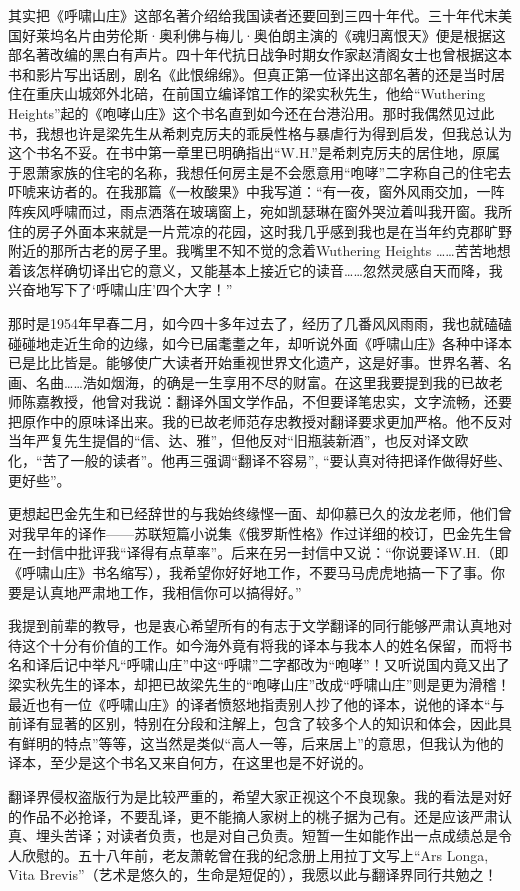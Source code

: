 \par 其实把《呼啸山庄》这部名著介绍给我国读者还要回到三四十年代。三十年代末美国好莱坞名片由劳伦斯·奥利佛与梅儿·奥伯朗主演的《魂归离恨天》便是根据这部名著改编的黑白有声片。四十年代抗日战争时期女作家赵清阁女士也曾根据这本书和影片写出话剧，剧名《此恨绵绵》。但真正第一位译出这部名著的还是当时居住在重庆山城郊外北碚，在前国立编译馆工作的梁实秋先生，他给“Wuthering Heights”起的《咆哮山庄》这个书名直到如今还在台港沿用。那时我偶然见过此书，我想也许是梁先生从希刺克厉夫的乖戾性格与暴虐行为得到启发，但我总认为这个书名不妥。在书中第一章里已明确指出“W.H.”是希刺克厉夫的居住地，原属于恩萧家族的住宅的名称，我想任何房主是不会愿意用“咆哮”二字称自己的住宅去吓唬来访者的。在我那篇《一枚酸果》中我写道：“有一夜，窗外风雨交加，一阵阵疾风呼啸而过，雨点洒落在玻璃窗上，宛如凯瑟琳在窗外哭泣着叫我开窗。我所住的房子外面本来就是一片荒凉的花园，这时我几乎感到我也是在当年约克郡旷野附近的那所古老的房子里。我嘴里不知不觉的念着Wuthering Heights ……苦苦地想着该怎样确切译出它的意义，又能基本上接近它的读音……忽然灵感自天而降，我兴奋地写下了‘呼啸山庄’四个大字！”
\par 那时是1954年早春二月，如今四十多年过去了，经历了几番风风雨雨，我也就磕磕碰碰地走近生命的边缘，如今已届耄耋之年，却听说外面《呼啸山庄》各种中译本已是比比皆是。能够使广大读者开始重视世界文化遗产，这是好事。世界名著、名画、名曲……浩如烟海，的确是一生享用不尽的财富。在这里我要提到我的已故老师陈嘉教授，他曾对我说：翻译外国文学作品，不但要译笔忠实，文字流畅，还要把原作中的原味译出来。我的已故老师范存忠教授对翻译要求更加严格。他不反对当年严复先生提倡的“信、达、雅”，但他反对“旧瓶装新酒”，也反对译文欧化，“苦了一般的读者”。他再三强调“翻译不容易”, “要认真对待把译作做得好些、更好些”。
\par 更想起巴金先生和已经辞世的与我始终缘悭一面、却仰慕已久的汝龙老师，他们曾对我早年的译作——苏联短篇小说集《俄罗斯性格》作过详细的校订，巴金先生曾在一封信中批评我“译得有点草率”。后来在另一封信中又说：“你说要译W.H.（即《呼啸山庄》书名缩写），我希望你好好地工作，不要马马虎虎地搞一下了事。你要是认真地严肃地工作，我相信你可以搞得好。”
\par 我提到前辈的教导，也是衷心希望所有的有志于文学翻译的同行能够严肃认真地对待这个十分有价值的工作。如今海外竟有将我的译本与我本人的姓名保留，而将书名和译后记中举凡“呼啸山庄”中这“呼啸”二字都改为“咆哮”！又听说国内竟又出了梁实秋先生的译本，却把已故梁先生的“咆哮山庄”改成“呼啸山庄”则是更为滑稽！最近也有一位《呼啸山庄》的译者愤怒地指责别人抄了他的译本，说他的译本“与前译有显著的区别，特别在分段和注解上，包含了较多个人的知识和体会，因此具有鲜明的特点”等等，这当然是类似“高人一等，后来居上”的意思，但我认为他的译本，至少是这个书名又来自何方，在这里也是不好说的。
\par 翻译界侵权盗版行为是比较严重的，希望大家正视这个不良现象。我的看法是对好的作品不必抢译，不要乱译，更不能摘人家树上的桃子据为己有。还是应该严肃认真、埋头苦译；对读者负责，也是对自己负责。短暂一生如能作出一点成绩总是令人欣慰的。五十八年前，老友萧乾曾在我的纪念册上用拉丁文写上“Ars Longa, Vita Brevis”（艺术是悠久的，生命是短促的），我愿以此与翻译界同行共勉之！
\par {}
\par {}











